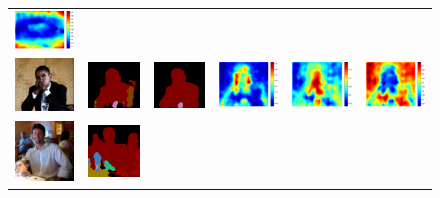 \documentclass[10pt,twocolumn,letterpaper]{article}
\begin{document}
\begin{figure}
\begin{tabular}{c c c c c c}
   \includegraphics[height=0.1\linewidth]{fig/coco/att3/COCO_val2014_000000001799.pdf} \\
   \includegraphics[height=0.12\linewidth]{fig/coco/img/COCO_val2014_000000001089.jpg} &
   \includegraphics[height=0.12\linewidth]{fig/coco/res_baseline/COCO_val2014_000000001089.png} &
   \includegraphics[height=0.12\linewidth]{fig/coco/res_sharenet/COCO_val2014_000000001089.png} &
   \includegraphics[height=0.12\linewidth]{fig/coco/att1/COCO_val2014_000000001089.pdf} &
   \includegraphics[height=0.12\linewidth]{fig/coco/att2/COCO_val2014_000000001089.pdf} &
   \includegraphics[height=0.12\linewidth]{fig/coco/att3/COCO_val2014_000000001089.pdf} \\
   \includegraphics[height=0.13\linewidth]{fig/coco/img/COCO_val2014_000000009007.jpg} &
   \includegraphics[height=0.13\linewidth]{fig/coco/res_baseline/COCO_val2014_000000009007.png} &

\end{tabular}
\end{figure}
\end{document}

